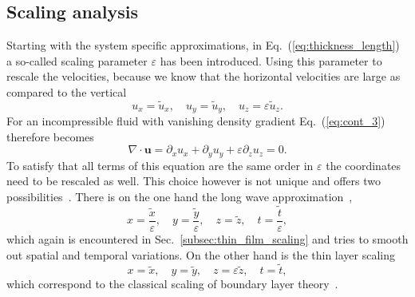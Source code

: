 \subsection{Scaling analysis}
\label{subssec:scaling_shallow water}
Starting with the system specific approximations, in Eq.~(\ref{eq:thickness_length}) a so-called scaling parameter $\varepsilon$ has been introduced. 
Using this parameter to rescale the velocities, because we know that the horizontal velocities are large as compared to the vertical
\begin{equation}\label{eq:vel_scaling}
    u_x = \tilde{u}_x,\quad u_y = \tilde{u}_y,\quad u_z = \varepsilon\tilde{u}_z.
\end{equation}
For an incompressible fluid with vanishing density gradient Eq.~(\ref{eq:cont_3}) therefore becomes
\begin{equation}\label{eq:cont_nondim}
    \nabla\cdot\mathbf{u} = \partial_x u_x + \partial_y u_y + \varepsilon\partial_z u_z = 0.
\end{equation}
To satisfy that all terms of this equation are the same order in $\varepsilon$ the coordinates need to be rescaled as well. 
This choice however is not unique and offers two possibilities~\cite{james2019towards}.
There is on the one hand the long wave approximation~\cite{oronLongscaleEvolutionThin1997},
\begin{equation}\label{eq:long_wave_scaling}
    x = \frac{\tilde{x}}{\varepsilon},\quad y = \frac{\tilde{y}}{\varepsilon},\quad z = \tilde{z},\quad t = \frac{\tilde{t}}{\varepsilon},
\end{equation}
which again is encountered in Sec.~\ref{subsec:thin_film_scaling} and tries to smooth out spatial and temporal variations.
On the other hand is the thin layer scaling
\begin{equation}\label{eq:scaling_thin_layer}
    x = \tilde{x},\quad y = \tilde{y},\quad z = \varepsilon\tilde{z},\quad t = \tilde{t},
\end{equation}
which correspond to the classical scaling of boundary layer theory~\cite{milne1996theoretical}.


